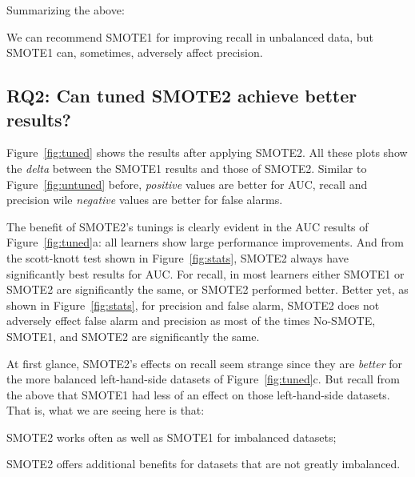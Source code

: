 
\noindent
Summarizing the above:
\begin{lesson1}
We can recommend SMOTE1 for improving recall in unbalanced data, but SMOTE1 can,
sometimes, adversely affect
precision.
\end{lesson1}

\subsection{\textbf{RQ2: Can tuned SMOTE2 achieve better results?}}

Figure~\ref{fig:tuned} shows the results
after applying SMOTE2. All these
plots show the {\em delta} between
the SMOTE1 results and those of SMOTE2.
Similar to Figure~\ref{fig:untuned} before, {\em positive}  values
are better for AUC, recall and precision
wile {\em negative} values are better for false alarms.

The benefit of SMOTE2's tunings is clearly evident in the AUC results of  Figure~\ref{fig:tuned}a:
all learners show large performance improvements. And from the scott-knott test shown in Figure~\ref{fig:stats}, SMOTE2 always have significantly best results for AUC. For recall, in most learners either SMOTE1 or SMOTE2 are significantly the same, or SMOTE2 performed better. 
Better yet,  as
shown in
Figure~\ref{fig:stats}, for precision and false alarm, SMOTE2 does
not adversely effect false alarm and precision as most of the times No-SMOTE, SMOTE1, and SMOTE2 are significantly the same.


At first glance, SMOTE2's effects on recall seem strange since they are
{\em better} for the more balanced left-hand-side datasets of
Figure~\ref{fig:tuned}c.  But recall from the above that SMOTE1 had less
of an effect on those left-hand-side datasets. That is, what we are seeing
here is that:
\bi
\item
SMOTE2 works often as well as SMOTE1 for imbalanced datasets;
\item
SMOTE2 offers additional benefits for datasets that are not greatly
imbalanced.
\ei

